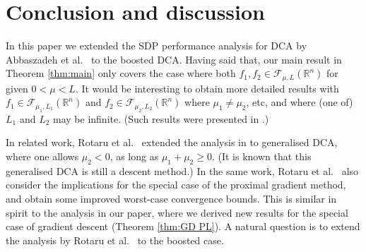 \documentclass{article} %
\begin{document}
\section{Conclusion and discussion}
\label{sec:conclusion}
In this paper we extended the SDP performance analysis for DCA by Abbaszadeh et al.\ \cite{abbaszad2024DCA} to the boosted DCA.
Having said that, our main result in Theorem \ref{thm:main} only covers the case where both $f_1,f_2 \in \mathcal{F}_{\mu,L}(\mathbb{R}^n)$
for given $0 < \mu < L$. It would be interesting to obtain more detailed results with $f_1 \in \mathcal{F}_{\mu_1,L_1}(\mathbb{R}^n)$
and $f_2 \in \mathcal{F}_{\mu_2,L_2}(\mathbb{R}^n)$ where $\mu_1 \ne \mu_2$, etc, and where (one of) $L_1$ and $L_2$ may be infinite.
(Such results were presented in \cite{abbaszad2024DCA}.)

In related work, Rotaru et al.\ \cite{rotaru2025tight} extended the  analysis in \cite{abbaszad2024DCA} to generalised DCA,
where one allows $\mu_2 < 0$,
as long as $\mu_1+\mu_2 \ge 0$. (It is known that this generalised DCA is still a descent method.)
In the same work, Rotaru et al.\ \cite{rotaru2025tight} also consider the implications for the special case of the proximal gradient method,
 and obtain some improved
worst-case convergence bounds. This is similar in spirit to the analysis in our paper, where we derived new results for  the special case of gradient descent (Theorem \ref{thm:GD PL}).
A natural question is to extend the analysis by Rotaru et al.\ \cite{rotaru2025tight} to the boosted case.
\end{document}

